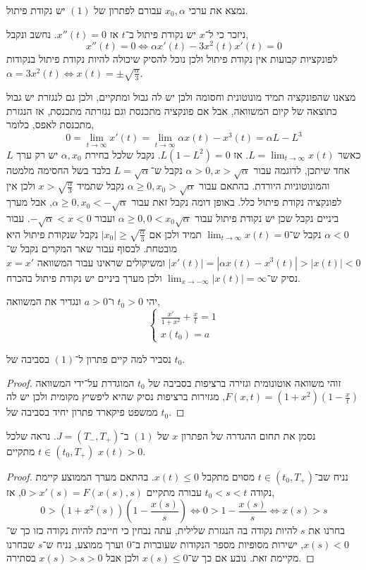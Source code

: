 \subquestion{}
נמצא את ערכי $x_0, \alpha$ עבורם לפתרון של $(1)$ יש נקודת פיתול.
\begin{solution}
	ניזכר כי ל־$x$ יש נקודת פיתול ב־$t$ אז $x''(t) = 0$.
	נחשב ונקבל,
	\[
		x''(t) = 0
		\iff \alpha x'(t) - 3 x^2(t) x'(t) = 0
	\]
	לפונקציות קבועות אין נקודת פיתול ולכן נוכל להסיק שיכולה להיות נקודת פיתול בנקודות $\alpha = 3 x^2(t) \iff x(t) = \pm \sqrt{\frac{\alpha}{3}}$.

	מצאנו שהפונקציה תמיד מונוטונית וחסומה ולכן יש לה גבול ומתקיים, ולכן גם לנגזרת יש גבול כתוצאה של קיום המשוואה, אבל אם פונקציה מתכנסת וגם נגזרתה מתכנסת, אז הנגזרת מתכנסת לאפס, כלומר,
	\[
		0
		= \lim_{t \to \infty} x'(t)
		= \lim_{t \to \infty} \alpha x(t) - x^3(t)
		= \alpha L - L^3
	\]
	כאשר $L = \lim_{t \to \infty} x(t)$. אז $L (1 - L^2) = 0$.
	נקבל שלכל בחירת $\alpha, x_0$ יש רק ערך $L$ אחד שיתכן, לדוגמה עבור $\alpha > 0, x > \sqrt{\alpha}$ נקבל ש־$L = \sqrt{\alpha}$ בלבד בשל החסימה מלמטה והמונוטוניות היורדת.
	בהתאם עבור $\alpha \ge 0, x_0 > \sqrt{\alpha}$ נקבל שתמיד $x > \sqrt{\frac{\alpha}{3}}$ ולכן אין לפונקציה נקודת פיתול כלל.
	באופן דומה נקבל זאת עבור $\alpha \ge 0, x_0 < -\sqrt{\alpha}$, אבל מערך ביניים נקבל שכן יש נקודת פיתול עבור $\alpha \ge 0, 0 < x_0 \sqrt{\alpha}$ ועבור $-\sqrt{\alpha} < x < 0$.
	עבור $\alpha < 0$ נקבל ש־$\lim_{t \to \infty} x(t) = 0$ תמיד ולכן אם $|x_0| \ge \sqrt{\frac{\alpha}{3}}$ נקבל שנקודת פיתול היא מובטחת.
	לבסוף עבור שאר המקרים נקבל ש־$|x'(t)| = |\alpha x(t) - x^3(t)| > |x(t)| < 0$ ומשיקולים שראינו עבור המשוואה $x = x'$ נסיק ש־$\lim_{x \to -\infty} |x(t)| = \infty$ ולכן מערך ביניים יש נקודת פיתול בהכרח.
\end{solution}

\question{}
יהי $t_0 > 0$ ו־$a > 0$ ונגדיר את המשוואה,
\[
	\begin{cases}
		\frac{x'}{1 + x^2} + \frac{x}{t} = 1 \\
		x(t_0) = a
	\end{cases}
	\tag{1}
\]

\subquestion{}
נסביר למה קיים פתרון ל־$(1)$ בסביבה של $t_0$.
\begin{proof}
	זוהי משוואה אוטונומית וגזירה ברציפות בסביבה של $t_0$ המוגדרת על־ידי המשוואה $F(x, t) = (1 + x^2)(1 - \frac{x}{t})$, מגזירות ברציפות נסיק שהיא ליפשיץ מקומית ולכן יש לה ממשפט פיקארד פתרון יחיד בסביבה של $t_0$.
\end{proof}

\subquestion{}
נסמן את תחום ההגדרה של הפתרון $x$ של $(1)$ ב־$J = (T_-, T_+)$.
נראה שלכל $t \in (t_0, T_+)$ מתקיים $x(t) > 0$.
\begin{proof}
	נניח שב־$t \in (t_0, T_+)$ מסוים מתקבל $x(t) \le 0$.
	בהתאם מערך הממוצע קיימת נקודה $t_0 < s < t$ עבורה מתקיים $0 > x'(s) = F(x(s), s)$,
	אז,
	\[
		0 > (1 + x^2(s)) (1 - \frac{x(s)}{s})
		\iff 0 > 1 - \frac{x(s)}{s}
		\iff x(s) > s
	\]
	בחרנו את $s$ להיות נקודה בה הנגזרת שלילית, עתה נבחין כי חייבת להיות נקודה כזו כך ש־$x(s) < 0$, ישירות מסופיות מספר הנקודות שעוברות ב־$0$ וערך ממוצע, נניח ש־$s$ שבחרנו מקיימת זאת.
	נובע אם כך ש־$x(s) \le 0$ ולכן אבל $x(s) > s > 0$ בסתירה.
\end{proof}

